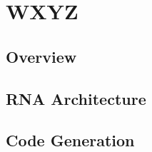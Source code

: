 \chapter{WXYZ}
\label{cap:architecture}


%

















\section{Overview}


\section{RNA Architecture}


\subsection{}

\section{Code Generation}




